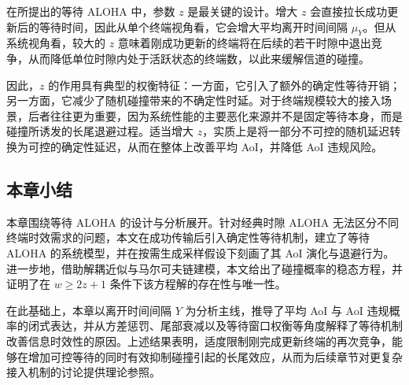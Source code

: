在所提出的等待 ALOHA 中，参数 $z$ 是最关键的设计。增大 $z$ 会直接拉长成功更新后的等待时间，因此从单个终端视角看，它会增大平均离开时间间隔 $\mu_Y$。但从系统视角看，较大的 $z$ 意味着刚成功更新的终端将在后续的若干时隙中退出竞争，从而降低单位时隙内处于活跃状态的终端数，以此来缓解信道的碰撞。

因此，$z$ 的作用具有典型的权衡特征：一方面，它引入了额外的确定性等待开销；另一方面，它减少了随机碰撞带来的不确定性时延。对于终端规模较大的接入场景，后者往往更为重要，因为系统性能的主要恶化来源并不是固定等待本身，而是碰撞所诱发的长尾退避过程。适当增大 $z$，实质上是将一部分不可控的随机延迟转换为可控的确定性延迟，从而在整体上改善平均 AoI，并降低 AoI 违规风险。

\subsection{本章小结}

本章围绕等待 ALOHA 的设计与分析展开。针对经典时隙 ALOHA 无法区分不同终端时效需求的问题，本文在成功传输后引入确定性等待机制，建立了等待 ALOHA 的系统模型，并在按需生成采样假设下刻画了其 AoI 演化与退避行为。进一步地，借助解耦近似与马尔可夫链建模，本文给出了碰撞概率的稳态方程，并证明了在 $w\ge 2z+1$ 条件下该方程解的存在性与唯一性。

在此基础上，本章以离开时间间隔 $Y$ 为分析主线，推导了平均 AoI 与 AoI 违规概率的闭式表达，并从方差惩罚、尾部衰减以及等待窗口权衡等角度解释了等待机制改善信息时效性的原因。上述结果表明，适度限制刚完成更新终端的再次竞争，能够在增加可控等待的同时有效抑制碰撞引起的长尾效应，从而为后续章节对更复杂接入机制的讨论提供理论参照。
